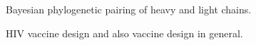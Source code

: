 

Bayesian phylogenetic pairing of heavy and light chains.


HIV vaccine design and also vaccine design in general.








